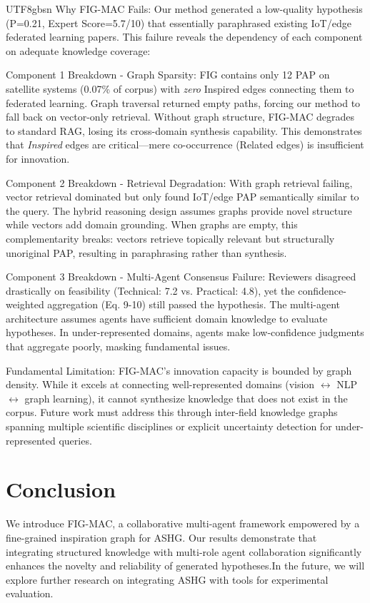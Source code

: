 \documentclass[11pt]{article}
\begin{document}
\begin{CJK}{UTF8}{gbsn}
Why FIG-MAC Fails: Our method generated a low-quality hypothesis (P=0.21, Expert Score=5.7/10) that essentially paraphrased existing IoT/edge federated learning papers. This failure reveals the dependency of each component on adequate knowledge coverage:

Component 1 Breakdown - Graph Sparsity: FIG contains only 12 PAP on satellite systems (0.07\% of corpus) with \emph{zero} Inspired edges connecting them to federated learning. Graph traversal returned empty paths, forcing our method to fall back on vector-only retrieval. Without graph structure, FIG-MAC degrades to standard RAG, losing its cross-domain synthesis capability. This demonstrates that \emph{Inspired} edges are critical—mere co-occurrence (Related edges) is insufficient for innovation.

Component 2 Breakdown - Retrieval Degradation: With graph retrieval failing, vector retrieval dominated but only found IoT/edge PAP semantically similar to the query. The hybrid reasoning design assumes graphs provide novel structure while vectors add domain grounding. When graphs are empty, this complementarity breaks: vectors retrieve topically relevant but structurally unoriginal PAP, resulting in paraphrasing rather than synthesis.

Component 3 Breakdown - Multi-Agent Consensus Failure: Reviewers disagreed drastically on feasibility (Technical: 7.2 vs. Practical: 4.8), yet the confidence-weighted aggregation (Eq. 9-10) still passed the hypothesis. The multi-agent architecture assumes agents have sufficient domain knowledge to evaluate hypotheses. In under-represented domains, agents make low-confidence judgments that aggregate poorly, masking fundamental issues.

Fundamental Limitation: FIG-MAC's innovation capacity is bounded by graph density. While it excels at connecting well-represented domains (vision $\leftrightarrow$ NLP $\leftrightarrow$ graph learning), it cannot synthesize knowledge that does not exist in the corpus. Future work must address this through inter-field knowledge graphs spanning multiple scientific disciplines or explicit uncertainty detection for under-represented queries.

\section{Conclusion}
We introduce FIG-MAC, a collaborative multi-agent framework empowered by a fine-grained inspiration graph for ASHG. Our results demonstrate that integrating structured knowledge with multi-role agent collaboration significantly enhances the novelty and reliability of generated hypotheses.In the future, we will explore further research on integrating ASHG with tools for experimental evaluation.


\end{CJK}
\end{document}
